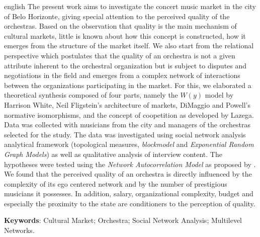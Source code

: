 \documentclass[a4paper, 12pt, openright, oneside, german, french, english, brazil]{abntex2}
\begin{document}
	\begin{resumo}[Abstract]
		\begin{otherlanguage*}{english}
			The present work aims to investigate the concert music market in the city of Belo Horizonte, giving special attention to the perceived quality of the orchestras. Based on the observation that quality is the main mechanism of cultural markets, little is known about how this concept is constructed, how it emerges from the structure of the market itself. We also start from the relational perspective which postulates that the quality of an orchestra is not a given attribute inherent to the orchestral organization but is subject to disputes and negotiations in the field and emerges from a complex network of interactions between the organizations participating in the market. For this, we elaborated a theoretical synthesis composed of four parts, namely the $W(y)$ model by Harrison White, Neil Fligstein's architecture of markets, DiMaggio and Powell's normative isomorphisms, and the concept of coopetition as developed by Lazega. Data was collected with musicians from the city and managers of the orchestras selected for the study. The data was investigated using social network analysis analytical framework (topological measures, \textit{blockmodel} and \textit{Exponential Random Graph Models}) as well as qualitative analysis of interview content. The hypotheses were tested using the \textit{Network Autocorrelation Model} as proposed by . We found that the perceived quality of an orchestra is directly influenced by the complexity of its ego centered network and by the number of prestigious musicians it possesses. In addition, salary, organizational complexity, budget and especially the proximity to the state are conditioners to the perception of quality.


                        \vspace{\onelineskip}
			\noindent
			\textbf{Keywords}: Cultural Market; Orchestra; Social Network Analysis; Multilevel Networks.
		\end{otherlanguage*}
	\end{resumo}
\end{document}
